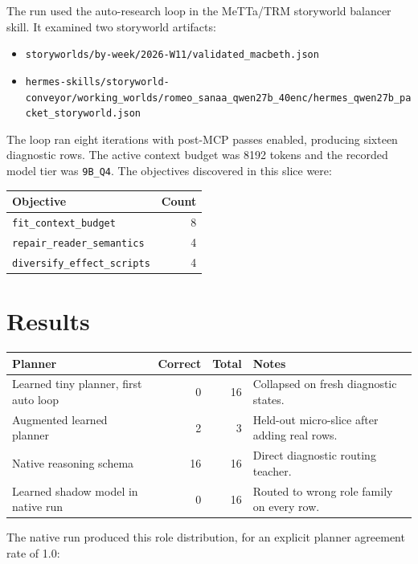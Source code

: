 \documentclass[11pt]{article}
\begin{document}
The run used the auto-research loop in the MeTTa/TRM storyworld balancer skill. It examined two storyworld artifacts:

\begin{itemize}
  \item \texttt{storyworlds/by-week/2026-W11/validated\_macbeth.json}
  \item \texttt{hermes-skills/storyworld-conveyor/working\_worlds/romeo\_sanaa\_qwen27b\_40enc/hermes\_qwen27b\_packet\_storyworld.json}
\end{itemize}

The loop ran eight iterations with post-MCP passes enabled, producing sixteen diagnostic rows. The active context budget was 8192 tokens and the recorded model tier was \texttt{9B\_Q4}. The objectives discovered in this slice were:

\begin{center}
\begin{tabular}{lr}
\toprule
Objective & Count \\
\midrule
\texttt{fit\_context\_budget} & 8 \\
\texttt{repair\_reader\_semantics} & 4 \\
\texttt{diversify\_effect\_scripts} & 4 \\
\bottomrule
\end{tabular}
\end{center}

\section{Results}

\begin{center}
\begin{tabular}{lrrl}
\toprule
Planner & Correct & Total & Notes \\
\midrule
Learned tiny planner, first auto loop & 0 & 16 & Collapsed on fresh diagnostic states. \\
Augmented learned planner & 2 & 3 & Held-out micro-slice after adding real rows. \\
Native reasoning schema & 16 & 16 & Direct diagnostic routing teacher. \\
Learned shadow model in native run & 0 & 16 & Routed to wrong role family on every row. \\
\bottomrule
\end{tabular}
\end{center}

The native run produced this role distribution, for an explicit planner agreement rate of 1.0:
\end{document}
